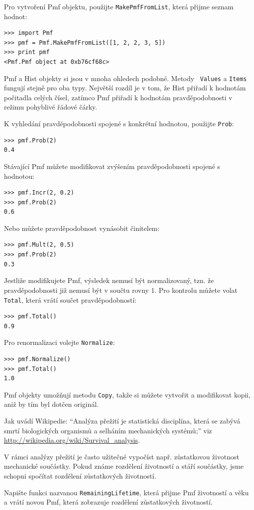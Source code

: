 \documentclass[12pt]{book}
\begin{document}
Pro vytvoření Pmf objektu, použijte {\tt MakePmfFromList}, která přijme seznam
hodnot:
%
\begin{verbatim}
>>> import Pmf
>>> pmf = Pmf.MakePmfFromList([1, 2, 2, 3, 5])
>>> print pmf
<Pmf.Pmf object at 0xb76cf68c>
\end{verbatim}

Pmf a Hist objekty si jsou v mnoha ohledech podobné. Metody {\tt
  Values} a {\tt Items} fungují stejně pro oba typy.  Největší rozdíl je v tom, že Hist přiřadí k
  hodnotám počitadla celých čísel, zatímco Pmf přiřadí k hodnotám pravděpodobnosti v režimu pohyblivé řádové čárky.

K vyhledání pravděpodobnosti spojené s konkrétní hodnotou, použijte {\tt Prob}:
%
\begin{verbatim}
>>> pmf.Prob(2)
0.4
\end{verbatim}

Stávající Pmf můžete modifikovat zvýšením pravděpodobnosti spojené s hodnotou:
%
\begin{verbatim}
>>> pmf.Incr(2, 0.2)
>>> pmf.Prob(2)
0.6
\end{verbatim}

Nebo můžete pravděpodobnost vynásobit činitelem:
%
\begin{verbatim}
>>> pmf.Mult(2, 0.5)
>>> pmf.Prob(2)
0.3
\end{verbatim}

Jestliže modifikujete Pmf, výsledek nemusí být normalizovaný, tzn. že pravděpodobnosti již nemusí být v součtu
rovny 1.  Pro kontrolu můžete volat {\tt
  Total}, která vrátí součet pravděpodobností:
%
\begin{verbatim}
>>> pmf.Total()
0.9
\end{verbatim}

Pro renormalizaci volejte {\tt Normalize}:
%
\begin{verbatim}
>>> pmf.Normalize()
>>> pmf.Total()
1.0
\end{verbatim}

Pmf objekty umožňují metodu {\tt Copy}, takže si můžete vytvořit a modifikovat kopii, aniž by tím byl
dotčen originál.

\begin{exercise}
Jak uvádí Wikipedie: ``Analýza přežití je statistická disciplína, která se zabývá smrtí
biologických organismů a selháním mechanických systémů;'' viz \url{http://wikipedia.org/wiki/Survival_analysis}.

V rámci analýzy přežití je často užitečné vypočíst např. zůstatkovou životnost mechanické součástky.
Pokud známe rozdělení životností a stáří součástky, jsme schopni spočítat rozdělení zůstatkových životností.

Napište funkci nazvanou {\tt RemainingLifetime}, která přijme Pmf životností a věku a vrátí novou
Pmf, která zobrazuje rozdělení zůstatkových životností.

\end{exercise}
\end{document}
